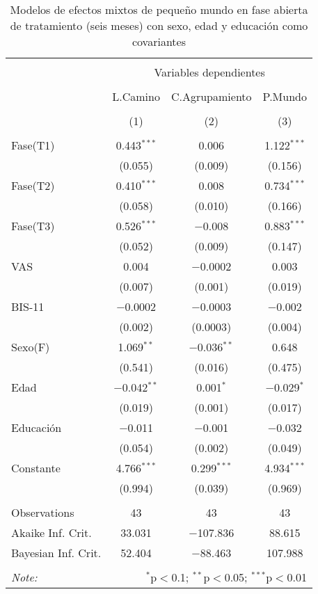\begin{table}[!htbp] \centering
    \small
  \caption{Modelos de efectos mixtos de pequeño mundo en fase abierta de tratamiento (seis meses) con sexo, edad y educación como covariantes}
  \label{tab:memL22}
\begin{tabular}{@{\extracolsep{5pt}}lccc}
\\[-1.8ex]\hline
\hline \\[-1.8ex]
 & \multicolumn{3}{c}{Variables dependientes} \\
\cline{2-4}
\\[-1.8ex] & L.Camino & C.Agrupamiento & P.Mundo \\
\\[-1.8ex] & (1) & (2) & (3)\\
\hline \\[-1.8ex]
 Fase(T1) & 0.443$^{***}$ & 0.006 & 1.122$^{***}$ \\
  & (0.055) & (0.009) & (0.156) \\
  Fase(T2) & 0.410$^{***}$ & 0.008 & 0.734$^{***}$ \\
  & (0.058) & (0.010) & (0.166) \\
  Fase(T3) & 0.526$^{***}$ & $-$0.008 & 0.883$^{***}$ \\
  & (0.052) & (0.009) & (0.147) \\
  VAS & 0.004 & $-$0.0002 & 0.003 \\
  & (0.007) & (0.001) & (0.019) \\
  BIS-11 & $-$0.0002 & $-$0.0003 & $-$0.002 \\
  & (0.002) & (0.0003) & (0.004) \\
  Sexo(F) & 1.069$^{**}$ & $-$0.036$^{**}$ & 0.648 \\
  & (0.541) & (0.016) & (0.475) \\
  Edad & $-$0.042$^{**}$ & 0.001$^{*}$ & $-$0.029$^{*}$ \\
  & (0.019) & (0.001) & (0.017) \\
  Educación & $-$0.011 & $-$0.001 & $-$0.032 \\
  & (0.054) & (0.002) & (0.049) \\
  Constante & 4.766$^{***}$ & 0.299$^{***}$ & 4.934$^{***}$ \\
  & (0.994) & (0.039) & (0.969) \\
 \hline \\[-1.8ex]
Observations & 43 & 43 & 43 \\
Akaike Inf. Crit. & 33.031 & $-$107.836 & 88.615 \\
Bayesian Inf. Crit. & 52.404 & $-$88.463 & 107.988 \\
\hline
\hline \\[-1.8ex]
\textit{Note:}  & \multicolumn{3}{r}{$^{*}$p$<$0.1; $^{**}$p$<$0.05; $^{***}$p$<$0.01} \\
\end{tabular}
\end{table}

